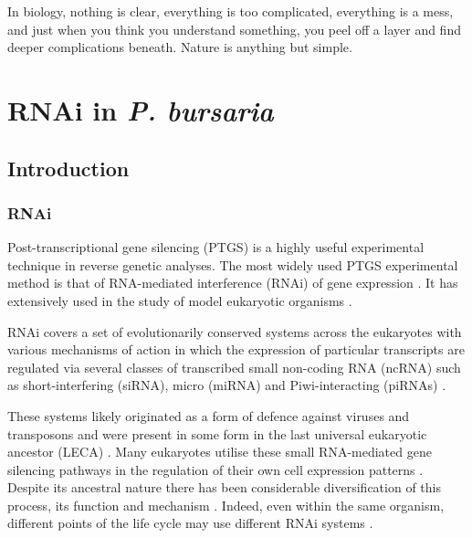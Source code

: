 \graphicspath{{chapters/6.Chapter_4/figures/}}

\begin{savequote}[75mm]
In biology, nothing is clear, everything is too complicated, everything is a mess, 
and just when you think you understand something, you peel off a layer and find 
deeper complications beneath. Nature is anything but simple.
\end{savequote}

\chapter{RNAi in \textit{P. bursaria}}

\section{Introduction}

\subsection{RNAi}

Post-transcriptional gene silencing (PTGS) is a highly useful experimental technique
in reverse genetic analyses.
The most widely used PTGS experimental method is that of RNA-mediated interference (RNAi)
of gene expression \citep{Fire1998}. It has extensively used in the
study of model eukaryotic organisms \citep{Morf2013,Batista2011,Matthew2004,Ketting2011,Chang2012}.

RNAi covers a set of evolutionarily conserved systems across the eukaryotes 
with various mechanisms of action in which the expression of particular transcripts
are regulated via several classes of transcribed small non-coding RNA (ncRNA)
such as short-interfering (siRNA), micro (miRNA) and Piwi-interacting (piRNAs) \citep{Carthew2009}.

These systems likely originated as a form of defence against
viruses and transposons \citep{Waterhouse2001,Buchon2006}
and were present in some form in the last universal eukaryotic
ancestor (LECA) \citep{Cerutti2006,Shabalina2008}.  Many eukaryotes
utilise these small RNA-mediated gene silencing pathways
in the regulation of their own cell expression patterns \citep{Wu2008}.
Despite its ancestral nature there has been considerable diversification
of this process, its function and mechanism \citep{Ketting2011}.
Indeed, even within the same organism, different points of the life cycle
may use different RNAi systems \citep{Flemr2013}.


